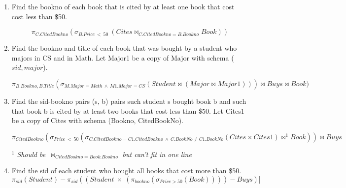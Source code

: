 \documentclass{article}
\begin{document}
\begin{enumerate}
    \item %
    Find the bookno of each book that is cited by at least one book that cost cost less than \$50.

    \begin{displaymath}
            \pi_{C.CitedBookno}(\sigma_{B.Price\ <\ 50}\ (Cites\bowtie_{C.CitedBookno=B.Bookno} Book))
    \end{displaymath}

    \item %
    Find the bookno and title of each book that was bought by a student who majors in CS and in Math. Let Major1 be a copy of Major with schema ($sid,major$).

    \begin{displaymath}
        \pi_{B.Bookno, B.Title}( \sigma_{M.Major=Math\ \wedge\ M1.Major=CS}(Student \bowtie (Major \bowtie Major1))) \bowtie Buys \bowtie Book)
    \end{displaymath}

    \item %
    Find the sid-bookno pairs (s, b) pairs such student s bought book b and
    such that book b is cited by at least two books that cost less than \$50. Let Cites1 be a copy of Cites with schema (Bookno, CitedBookNo).

    \begin{displaymath}
        \pi_{CitedBookno}(
        \sigma_{Price\ <\ 50} (\sigma_{C.CitedBookno=C1.CitedBookno\ \wedge\ C.BookNo \ne C1.BookNo}(Cites \times Cites1) \bowtie^1 Book)) \bowtie Buys
    \end{displaymath}

    \textit{$^1$ Should be\ $\bowtie_{CitedBookno=Book.Bookno}$ but can't fit in one line}

    \item %
    Find the sid of each student who bought all books that cost more than \$50.
    \begin{displaymath}
        \pi_{sid}(Student) -
            \pi_{sid}((Student\ \times\ (\pi_{bookno}(\sigma_{Price > 50}(Book)))) %
            - Buys)] %
    \end{displaymath}


\end{enumerate}
\end{document}
